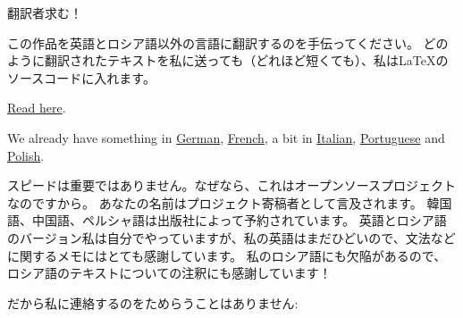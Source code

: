 \vspace*{\fill}

\Huge 翻訳者求む！

\normalsize

\bigskip
\bigskip
\bigskip

この作品を英語とロシア語以外の言語に翻訳するのを手伝ってください。
どのように翻訳されたテキストを私に送っても（どれほど短くても）、私はLaTeXのソースコードに入れます。

\href{https://github.com/dennis714/RE-for-beginners/blob/master/Translation.md}{Read here}.

We already have something in \href{https://beginners.re/RE4B-DE.pdf}{German},
\href{https://beginners.re/RE4B-FR.pdf}{French}, a bit in
\href{https://yurichev.com/tmp/RE4B-IT-partial.pdf}{Italian},
\href{https://yurichev.com/tmp/RE4B-PTBR-lite2.pdf}{Portuguese} and
\href{https://yurichev.com/tmp/RE4B-PL.pdf}{Polish}.

スピードは重要ではありません。なぜなら、これはオープンソースプロジェクトなのですから。
あなたの名前はプロジェクト寄稿者として言及されます。
韓国語、中国語、ペルシャ語は出版社によって予約されています。
英語とロシア語のバージョン私は自分でやっていますが、私の英語はまだひどいので、文法などに関するメモにはとても感謝しています。
私のロシア語にも欠陥があるので、ロシア語のテキストについての注釈にも感謝しています！

だから私に連絡するのをためらうことはありません: \GTT{\EMAIL}

\vspace*{\fill}
\vfill
